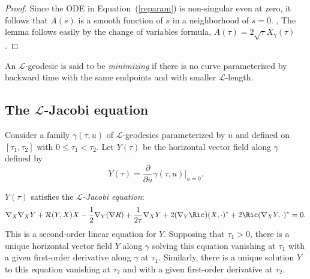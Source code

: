 \begin{proof}
Since the ODE in Equation~(\ref{reparam})  is non-singular even at
zero, it follows that $A(s)$ is a smooth function of $s$ in a
neighborhood of $s=0$. , The lemma follows easily by the change of
variables formula, $A(\tau)=2\sqrt{\tau}X_\gamma(\tau)$.
\end{proof}

\begin{definition}\label{def:l-geodesic-minimizing}
An ${\mathcal L}$-geodesic is said to be {\em
minimizing} if there is no
curve parameterized by backward time with the same endpoints and
with smaller ${\mathcal L}$-length.
\end{definition}


\subsection{The ${\mathcal L}$-Jacobi equation}

Consider a family $\gamma(\tau,u)$ of ${\mathcal L}$-geodesics parameterized by
$u$ and defined on $[\tau_1,\tau_2]$ with $0\le \tau_1<\tau_2$. Let $Y(\tau)$
be the horizontal vector field along $\gamma$ defined by
$$Y(\tau)=\frac{\partial}{\partial u}\gamma(\tau,u)|_{u=0}.$$


\begin{lemma}\label{lem:l-jacobi-equation}
$Y(\tau)$ satisfies the {\em ${\mathcal L}$-Jacobi
equation}:
\begin{equation}\label{jaceqn}\nabla_X\nabla_XY+{\mathcal
R}(Y,X)X-\frac{1}{2}\nabla_Y(\nabla
R)+\frac{1}{2\tau}\nabla_XY+2(\nabla_Y\Ric)(X,\cdot)^*+2\Ric(\nabla_XY,\cdot)^*=0.\end{equation} This is a second-order
linear equation for $Y$. Supposing that $\tau_1>0$, there is a
unique horizontal vector field $Y$ along $\gamma$ solving this
equation vanishing at $\tau_1$ with a given first-order derivative
along $\gamma$ at $\tau_1$. Similarly, there is a unique solution
$Y$ to this equation vanishing at $\tau_2$ and with a given
first-order derivative at $\tau_2$.
\end{lemma}


